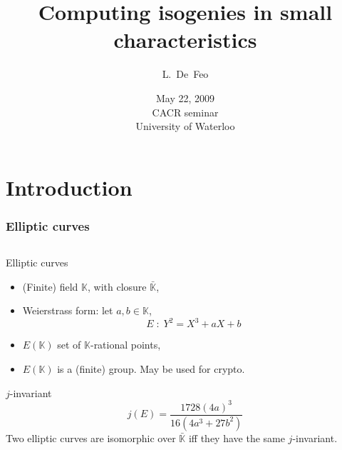 \documentclass[10pt]{beamer}
\title{Computing isogenies in small characteristics}
\author[L.~De~Feo]{L.~De~Feo}
\institute[École Polytechnique]{École Polytechnique, Paris, France}
\date[U of Waterloo, May 22, 2009]{May 22, 2009\\CACR seminar\\University of Waterloo}
\newcommand{\clot}[1]{\bar{#1}}  %
\newcommand{\K}{\mathbb{K}}  %
\newcommand{\0}{\mathcal{O}}  %
\begin{document}
\begin{frame}
  \titlepage
\end{frame}


\section{Introduction}

\begin{frame}
  \frametitle{Elliptic curves}

  \begin{columns} 
    \begin{column}{0.55\textwidth}
      \begin{block}{Elliptic curves}
        \begin{itemize}
        \item (Finite) field $\K$, with closure $\clot{\K}$,
        \item Weierstrass form: let $a,b\in\K$, 
          \[E \;:\; Y^2 = X^3 + aX + b\]
        \item $E(\K)$ set of $\K$-rational points,
        \item $E(\K)$ is a (finite) group. May be used for crypto.
        \end{itemize}
      \end{block}

      \begin{block}{$j$-invariant}
        \[j(E) = \frac{1728(4a)^3}{16(4a^3 + 27b^2)}\]
        Two elliptic curves are isomorphic over $\clot{\K}$ iff they
        have the same $j$-invariant.
      \end{block}
  
    \end{column}


\end{columns}
\end{frame}
\end{document}
